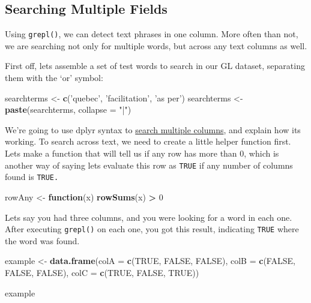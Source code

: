 \documentclass[
]{book}
\newenvironment{Shaded}{\begin{snugshade}}{\end{snugshade}}
\newcommand{\ControlFlowTok}[1]{\textcolor[rgb]{0.13,0.29,0.53}{\textbf{#1}}}
\newcommand{\DataTypeTok}[1]{\textcolor[rgb]{0.13,0.29,0.53}{#1}}
\newcommand{\DecValTok}[1]{\textcolor[rgb]{0.00,0.00,0.81}{#1}}
\newcommand{\KeywordTok}[1]{\textcolor[rgb]{0.13,0.29,0.53}{\textbf{#1}}}
\newcommand{\NormalTok}[1]{#1}
\newcommand{\OperatorTok}[1]{\textcolor[rgb]{0.81,0.36,0.00}{\textbf{#1}}}
\newcommand{\OtherTok}[1]{\textcolor[rgb]{0.56,0.35,0.01}{#1}}
\newcommand{\StringTok}[1]{\textcolor[rgb]{0.31,0.60,0.02}{#1}}
\begin{document}
\hypertarget{searching-multiple-fields}{%
\subsection{Searching Multiple Fields}\label{searching-multiple-fields}}

Using \texttt{grepl()}, we can detect text phrases in one column. More often than not, we are searching not only for multiple words, but across any text columns as well.

First off, lets assemble a set of test words to search in our GL dataset, separating them with the `or' symbol:

\begin{Shaded}
\begin{Highlighting}[]
\NormalTok{searchterms <-}\StringTok{ }\KeywordTok{c}\NormalTok{(}\StringTok{'quebec'}\NormalTok{, }\StringTok{'facilitation'}\NormalTok{, }\StringTok{'as per'}\NormalTok{)}
\NormalTok{searchterms <-}\StringTok{ }\KeywordTok{paste}\NormalTok{(searchterms, }\DataTypeTok{collapse =} \StringTok{"|"}\NormalTok{)}
\end{Highlighting}
\end{Shaded}

We're going to use dplyr syntax to \href{https://dplyr.tidyverse.org/articles/colwise.html\#how-do-you-convert-existing-code-}{search multiple columns}, and explain how its working. To search across text, we need to create a little helper function first. Lets make a function that will tell us if any row has more than 0, which is another way of saying lets evaluate this row as \texttt{TRUE} if any number of columns found is \texttt{TRUE.}

\begin{Shaded}
\begin{Highlighting}[]
\NormalTok{rowAny <-}\StringTok{ }\ControlFlowTok{function}\NormalTok{(x) }\KeywordTok{rowSums}\NormalTok{(x) }\OperatorTok{>}\StringTok{ }\DecValTok{0}
\end{Highlighting}
\end{Shaded}

Lets say you had three columns, and you were looking for a word in each one. After executing \texttt{grepl()} on each one, you got this result, indicating \texttt{TRUE} where the word was found.

\begin{Shaded}
\begin{Highlighting}[]
\NormalTok{example <-}\StringTok{ }\KeywordTok{data.frame}\NormalTok{(}\DataTypeTok{colA =} \KeywordTok{c}\NormalTok{(}\OtherTok{TRUE}\NormalTok{, }\OtherTok{FALSE}\NormalTok{, }\OtherTok{FALSE}\NormalTok{),}
          \DataTypeTok{colB =} \KeywordTok{c}\NormalTok{(}\OtherTok{FALSE}\NormalTok{, }\OtherTok{FALSE}\NormalTok{, }\OtherTok{FALSE}\NormalTok{),}
          \DataTypeTok{colC =} \KeywordTok{c}\NormalTok{(}\OtherTok{TRUE}\NormalTok{, }\OtherTok{FALSE}\NormalTok{, }\OtherTok{TRUE}\NormalTok{))}

\NormalTok{example}
\end{Highlighting}
\end{Shaded}
\end{document}
